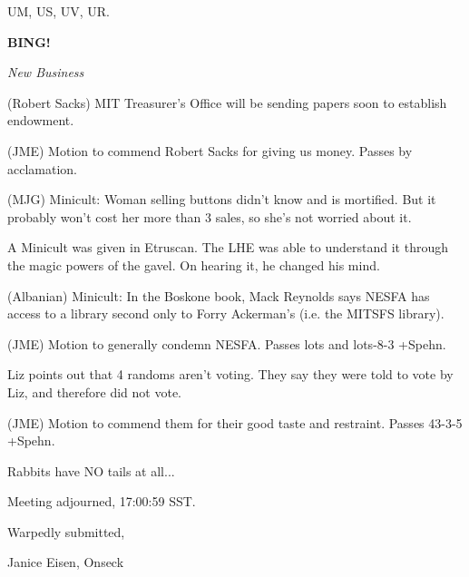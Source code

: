 \documentclass[12pt]{article}
\newcommand{\bing}{{\bf BING!} }
\newcommand{\goto}[1]{\bing \vskip 12pt \centerline{{\em{#1}}}}
\begin{document}
UM, US, UV, UR.

\goto{New Business}

(Robert Sacks) MIT Treasurer's Office will be sending papers soon to establish endowment.

(JME) Motion to commend Robert Sacks for giving us money. Passes by acclamation.

(MJG) Minicult: Woman selling buttons didn't know and is mortified. But it probably won't cost her more than 3 sales, so she's not worried about it.

A Minicult was given in Etruscan. The LHE was able to understand it through the magic powers of the gavel. On hearing it, he changed his mind.

(Albanian) Minicult: In the Boskone book, Mack Reynolds says NESFA has access to a library second only to Forry Ackerman's (i.e. the MITSFS library).

(JME) Motion to generally condemn NESFA. Passes lots and lots-8-3 +Spehn.

Liz points out that 4 randoms aren't voting. They say they were told to vote by Liz, and therefore did not vote.

(JME) Motion to commend them for their good taste and restraint. Passes 43-3-5 +Spehn.

Rabbits have NO tails at all...

\vspace{12pt}

\noindent
Meeting adjourned, 17:00:59 SST.

\vspace{18pt}

\centerline{Warpedly submitted,}
\centerline{Janice Eisen, Onseck}
\end{document}
